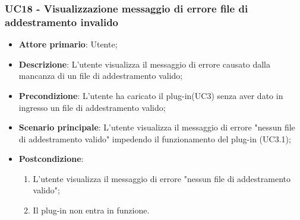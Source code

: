 \subsubsection{UC18 - Visualizzazione messaggio di errore file di addestramento invalido}
\label{sssec:uc18}
\begin{itemize}
  \item \textbf{Attore primario}: Utente;
  \item \textbf{Descrizione}: L'utente visualizza il messaggio di errore causato dalla mancanza di un file di addestramento valido;
  \item \textbf{Precondizione}: L'utente ha caricato il plug-in(UC3) senza aver dato in ingresso un file di addestramento valido;
  \item \textbf{Scenario principale}: L'utente visualizza il messaggio di errore "nessun file di addestramento valido" impedendo il funzionamento del plug-in (UC3.1);
  \item \textbf{Postcondizione}:
  \begin{enumerate}
		\item L'utente visualizza il messaggio di errore "nessun file di addestramento valido";
		\item Il plug-in non entra in funzione.
	\end{enumerate}
\end{itemize}
